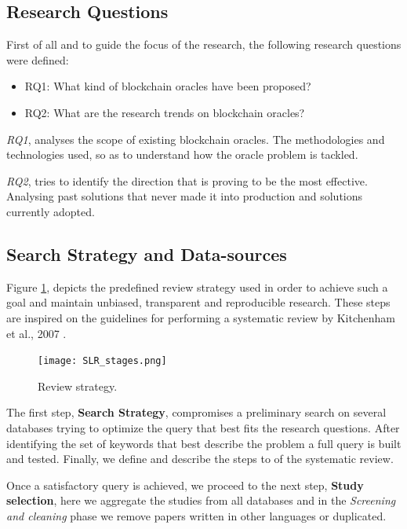\subsection{Research Questions}
First of all and to guide the focus of the research, the following research questions were defined:
\begin{itemize}
  \item RQ1: What kind of blockchain oracles have been proposed?
  \item RQ2: What are the research trends on blockchain oracles?
\end{itemize}

\textit{RQ1}, analyses the scope of existing blockchain oracles. The methodologies and technologies used, so as to understand how the oracle problem is tackled.

\textit{RQ2}, tries to identify the direction that is proving to be the most effective. Analysing past solutions that never made it into production and solutions currently adopted.

\subsection{Search Strategy and Data-sources}
Figure \ref{fig:/figures/SLR_stages}, depicts the predefined review strategy used in order to achieve such a goal and maintain unbiased, transparent and reproducible research. These steps are inspired on the guidelines for performing a systematic review by Kitchenham et al., 2007 \citet{Kitchenham2007}.

\begin{figure}[h]
  \begin{center}
    \leavevmode
    \texttt{[image: SLR\_stages.png]}
    \caption{Review strategy.}
    \label{fig:/figures/SLR_stages}
  \end{center}
\end{figure}

The first step, \textbf{Search Strategy}, compromises a preliminary search on several databases trying to optimize the query that best fits the research questions. After identifying the set of keywords that best describe the problem a full query is built and tested. Finally, we define and describe the steps to of the systematic review.

Once a satisfactory query is achieved, we proceed to the next step, \textbf{Study selection}, here we aggregate the studies from all databases and in the \textit{Screening and cleaning} phase we remove papers written in other languages or duplicated.

